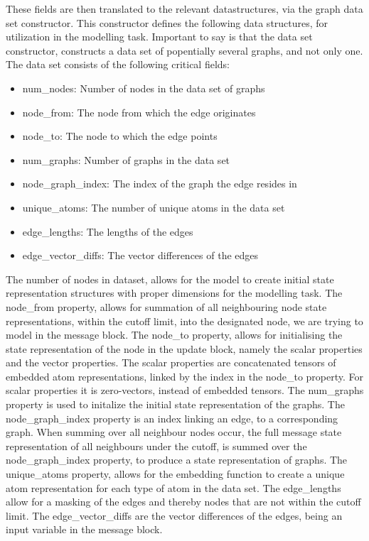 These fields are then translated to the relevant datastructures, via the graph data set constructor. This constructor
defines the following data structures, for utilization in the modelling task. Important to say is that the data set constructor,
constructs a data set of popentially several graphs, and not only one. The data set consists of the following critical fields:
\begin{itemize}
    \item num\_nodes: Number of nodes in the data set of graphs
    \item node\_from: The node from which the edge originates
    \item node\_to: The node to which the edge points
    \item num\_graphs: Number of graphs in the data set
    \item node\_graph\_index: The index of the graph the edge resides in
    \item unique\_atoms: The number of unique atoms in the data set
    \item edge\_lengths: The lengths of the edges
    \item edge\_vector\_diffs: The vector differences of the edges
\end{itemize}

The number of nodes in dataset, allows for the model to create initial state representation structures with proper dimensions for the
modelling task. The node\_from property, allows for summation of all neighbouring node state representations, within the cutoff limit,
into the designated node, we are trying to model in the message block. The node\_to property, allows for initialising the state representation
of the node in the update block, namely the scalar properties and the vector properties. The scalar properties are concatenated tensors of
embedded atom representations, linked by the index in the node\_to property. For scalar properties it is zero-vectors, instead of embedded
tensors. The num\_graphs property is used to initalize the initial state representation of the graphs. The node\_graph\_index property
is an index linking an edge, to a corresponding graph. When summing over all neighbour nodes occur, the full message state representation of all
neighbours under the cutoff, is summed over the node\_graph\_index property, to produce a state representation of graphs. The unique\_atoms
property, allows for the embedding function to create a unique atom representation for each type of atom in the data set. The edge\_lengths
allow for a masking of the edges and thereby nodes that are not within the cutoff limit. The edge\_vector\_diffs are the vector differences
of the edges, being an input variable in the message block.

